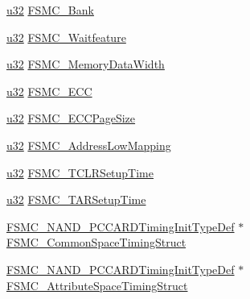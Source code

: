 \begin{DoxyCompactItemize}
\item 
\hyperlink{agilefox_2library_2inc_2stm32f10x__type_8h_a2caf5cd7bcdbe1eefa727f44ffb10bac}{u32} \hyperlink{struct_f_s_m_c___n_a_n_d_init_type_def_a385085e661b9bb83dc73209cd318d0ab}{F\+S\+M\+C\+\_\+\+Bank}
\item 
\hyperlink{agilefox_2library_2inc_2stm32f10x__type_8h_a2caf5cd7bcdbe1eefa727f44ffb10bac}{u32} \hyperlink{struct_f_s_m_c___n_a_n_d_init_type_def_a16a252f0f8e2e28b5d85f0595682f750}{F\+S\+M\+C\+\_\+\+Waitfeature}
\item 
\hyperlink{agilefox_2library_2inc_2stm32f10x__type_8h_a2caf5cd7bcdbe1eefa727f44ffb10bac}{u32} \hyperlink{struct_f_s_m_c___n_a_n_d_init_type_def_a7c001eab13cc6ab6f1b1cadd7c59ff38}{F\+S\+M\+C\+\_\+\+Memory\+Data\+Width}
\item 
\hyperlink{agilefox_2library_2inc_2stm32f10x__type_8h_a2caf5cd7bcdbe1eefa727f44ffb10bac}{u32} \hyperlink{struct_f_s_m_c___n_a_n_d_init_type_def_afdee28036db97341491f790df8169570}{F\+S\+M\+C\+\_\+\+E\+CC}
\item 
\hyperlink{agilefox_2library_2inc_2stm32f10x__type_8h_a2caf5cd7bcdbe1eefa727f44ffb10bac}{u32} \hyperlink{struct_f_s_m_c___n_a_n_d_init_type_def_a2230b5612c5ae810f57accc94ca49081}{F\+S\+M\+C\+\_\+\+E\+C\+C\+Page\+Size}
\item 
\hyperlink{agilefox_2library_2inc_2stm32f10x__type_8h_a2caf5cd7bcdbe1eefa727f44ffb10bac}{u32} \hyperlink{struct_f_s_m_c___n_a_n_d_init_type_def_af7affbed59a0cd0a102aa76d06342849}{F\+S\+M\+C\+\_\+\+Address\+Low\+Mapping}
\item 
\hyperlink{agilefox_2library_2inc_2stm32f10x__type_8h_a2caf5cd7bcdbe1eefa727f44ffb10bac}{u32} \hyperlink{struct_f_s_m_c___n_a_n_d_init_type_def_a094088666c8e4d51635b639d37dd9d44}{F\+S\+M\+C\+\_\+\+T\+C\+L\+R\+Setup\+Time}
\item 
\hyperlink{agilefox_2library_2inc_2stm32f10x__type_8h_a2caf5cd7bcdbe1eefa727f44ffb10bac}{u32} \hyperlink{struct_f_s_m_c___n_a_n_d_init_type_def_a377f520feb3a9d0335b7284a318d9802}{F\+S\+M\+C\+\_\+\+T\+A\+R\+Setup\+Time}
\item 
\hyperlink{struct_f_s_m_c___n_a_n_d___p_c_c_a_r_d_timing_init_type_def}{F\+S\+M\+C\+\_\+\+N\+A\+N\+D\+\_\+\+P\+C\+C\+A\+R\+D\+Timing\+Init\+Type\+Def} $\ast$ \hyperlink{struct_f_s_m_c___n_a_n_d_init_type_def_a8ec59d3e29ae3206301ec47d63dfc7ad}{F\+S\+M\+C\+\_\+\+Common\+Space\+Timing\+Struct}
\item 
\hyperlink{struct_f_s_m_c___n_a_n_d___p_c_c_a_r_d_timing_init_type_def}{F\+S\+M\+C\+\_\+\+N\+A\+N\+D\+\_\+\+P\+C\+C\+A\+R\+D\+Timing\+Init\+Type\+Def} $\ast$ \hyperlink{struct_f_s_m_c___n_a_n_d_init_type_def_a586c3d691f1d786510cc75bf2b164f42}{F\+S\+M\+C\+\_\+\+Attribute\+Space\+Timing\+Struct}

\end{DoxyCompactItemize}
